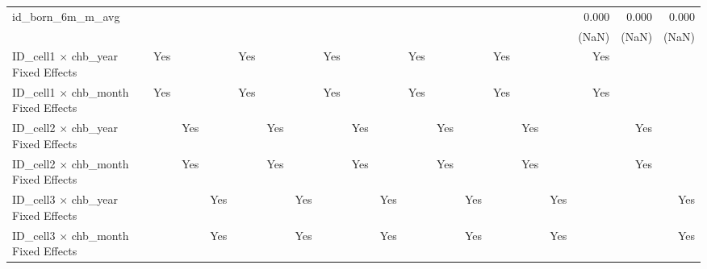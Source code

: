 \begin{tabular}{lrrrrrrrrrrrrrrrrrr}
id\_born\_6m\_m\_avg                        &             &             &             &             &             &             &             &             &             &             &             &             &             &             &             &       0.000 &       0.000 &       0.000 \\ 
                                            &             &             &             &             &             &             &             &             &             &             &             &             &             &             &             &       (NaN) &       (NaN) &       (NaN) \\ 
\midrule
ID\_cell1 $\times$ chb\_year Fixed Effects  &         Yes &             &             &         Yes &             &             &         Yes &             &             &         Yes &             &             &         Yes &             &             &         Yes &             &             \\ 
ID\_cell1 $\times$ chb\_month Fixed Effects &         Yes &             &             &         Yes &             &             &         Yes &             &             &         Yes &             &             &         Yes &             &             &         Yes &             &             \\ 
ID\_cell2 $\times$ chb\_year Fixed Effects  &             &         Yes &             &             &         Yes &             &             &         Yes &             &             &         Yes &             &             &         Yes &             &             &         Yes &             \\ 
ID\_cell2 $\times$ chb\_month Fixed Effects &             &         Yes &             &             &         Yes &             &             &         Yes &             &             &         Yes &             &             &         Yes &             &             &         Yes &             \\ 
ID\_cell3 $\times$ chb\_year Fixed Effects  &             &             &         Yes &             &             &         Yes &             &             &         Yes &             &             &         Yes &             &             &         Yes &             &             &         Yes \\ 
ID\_cell3 $\times$ chb\_month Fixed Effects &             &             &         Yes &             &             &         Yes &             &             &         Yes &             &             &         Yes &             &             &         Yes &             &             &         Yes \\ 

\end{tabular}
